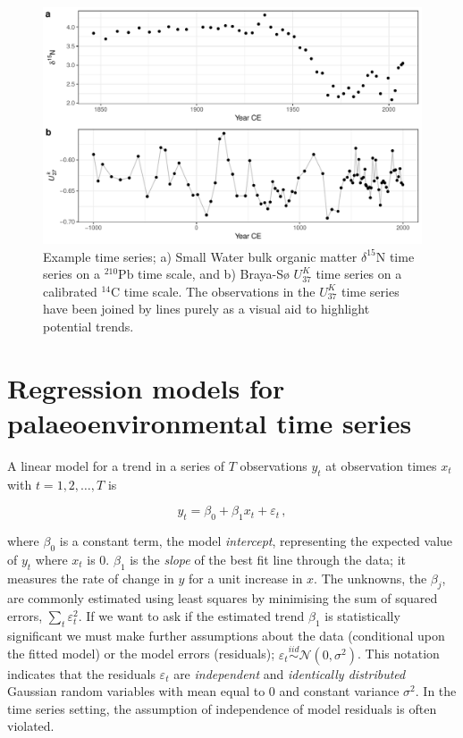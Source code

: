 \documentclass[12pt,]{article}
\newcommand{\uk}{\ensuremath{\mathit{U}^{\mathit{K}}_{\mathup{37}}}}
\begin{document}
\begin{figure}

{\centering \includegraphics[width=0.8\linewidth]{manuscript_files/figure-latex/data-figure-1} 

}

\caption{Example time series; a) Small Water bulk organic matter $\delta^{15}\text{N}$ time series on a ${}^{210}\text{Pb}$ time scale, and b) Braya-Sø \uk{} time series on a calibrated ${}^{14}\text{C}$ time scale. The observations in the \uk{} time series have been joined by lines purely as a visual aid to highlight potential trends.}\label{fig:data-figure}
\end{figure}

\section{Regression models for palaeoenvironmental time
series}\label{regression-models-for-palaeoenvironmental-time-series}

A linear model for a trend in a series of \(T\) observations \(y_t\) at
observation times \(x_t\) with \(t = 1, 2, \ldots, T\) is

\begin{equation} \label{eq:linear-model}
y_t = \beta_0 + \beta_1 x_t + \varepsilon_t \,,
\end{equation}

where \(\beta_0\) is a constant term, the model \emph{intercept},
representing the expected value of \(y_t\) where \(x_t\) is 0.
\(\beta_1\) is the \emph{slope} of the best fit line through the data;
it measures the rate of change in \(y\) for a unit increase in \(x\).
The unknowns, the \(\beta_j\), are commonly estimated using least
squares by minimising the sum of squared errors,
\(\sum_t \varepsilon_t^2\). If we want to ask if the estimated trend
\(\beta_1\) is statistically significant we must make further
assumptions about the data (conditional upon the fitted model) or the
model errors (residuals);
\(\varepsilon_t \stackrel{iid}{\sim} \mathcal{N}(0, \sigma^2)\). This
notation indicates that the residuals \(\varepsilon_t\) are
\emph{independent} and \emph{identically distributed} Gaussian random
variables with mean equal to \(0\) and constant variance \(\sigma^2\).
In the time series setting, the assumption of independence of model
residuals is often violated.
\end{document}
